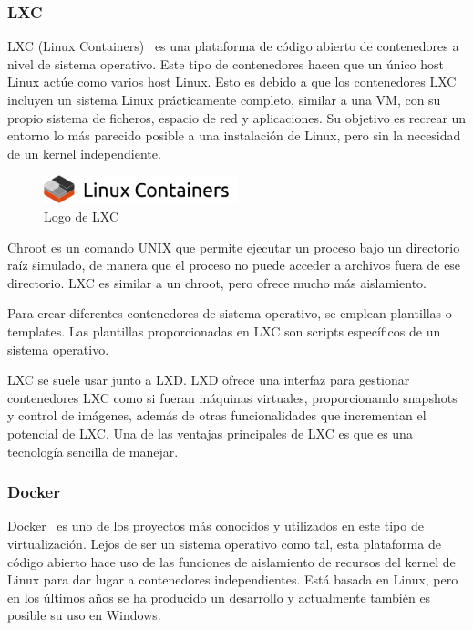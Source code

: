 \subsubsection{LXC}
	LXC (Linux Containers)~\cite{lxc} es una plataforma de código abierto de contenedores a nivel de sistema operativo. Este tipo de contenedores hacen que un único host Linux actúe como varios host Linux. Esto es debido a que los contenedores LXC incluyen un sistema Linux prácticamente completo, similar a una VM, con su propio sistema de ficheros, espacio de red y aplicaciones. Su objetivo es recrear un entorno lo más parecido posible a una instalación de Linux, pero sin la necesidad de un kernel independiente. 

	\begin{figure}[h]
	\centering
	\includegraphics[width=0.5\textwidth]{../imgs/EdA/lxc.png}
	\caption{Logo de LXC}
	\label{fig:lxc}
	\end{figure}

	Chroot es un comando UNIX que permite ejecutar un proceso bajo un directorio raíz simulado, de manera que el proceso no puede acceder a archivos fuera de ese directorio. LXC es similar a un chroot, pero ofrece mucho más aislamiento. 

	Para crear diferentes contenedores de sistema operativo, se emplean plantillas o templates. Las plantillas proporcionadas en LXC son scripts específicos de un sistema operativo.

	LXC se suele usar junto a LXD. LXD ofrece una interfaz para gestionar contenedores LXC como si fueran máquinas virtuales, proporcionando snapshots y control de imágenes, además de otras funcionalidades que incrementan el potencial de LXC. Una de las ventajas principales de LXC es que es una tecnología sencilla de manejar.

\subsubsection{Docker}
	Docker~\cite{docker1} es uno de los proyectos más conocidos y utilizados en este tipo de virtualización. Lejos de ser un sistema operativo como tal, esta plataforma de código abierto hace uso de las funciones de aislamiento de recursos del kernel de Linux para dar lugar a contenedores independientes. Está basada en Linux, pero en los últimos años se ha producido un desarrollo y actualmente también es posible su uso en Windows.

